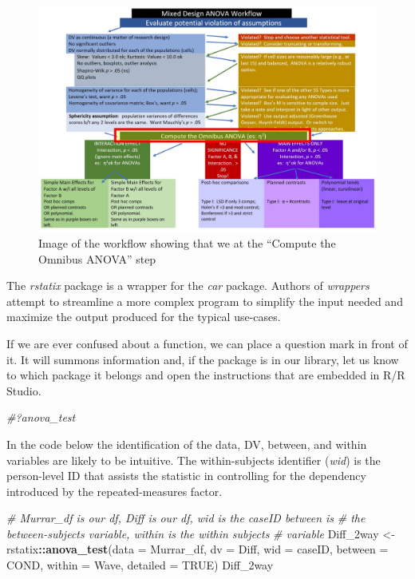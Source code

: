 \documentclass[
  11pt,
]{book}
\newenvironment{Shaded}{\begin{snugshade}}{\end{snugshade}}
\newcommand{\AttributeTok}[1]{\textcolor[rgb]{0.27,0.27,0.27}{#1}}
\newcommand{\CommentTok}[1]{\textcolor[rgb]{0.37,0.37,0.37}{\textit{#1}}}
\newcommand{\ConstantTok}[1]{\textcolor[rgb]{0.37,0.37,0.37}{#1}}
\newcommand{\FunctionTok}[1]{\textcolor[rgb]{0.27,0.27,0.27}{\textbf{#1}}}
\newcommand{\NormalTok}[1]{#1}
\newcommand{\OtherTok}[1]{\textcolor[rgb]{0.37,0.37,0.37}{#1}}
\newcommand{\SpecialCharTok}[1]{\textcolor[rgb]{0.43,0.43,0.43}{\textbf{#1}}}
\begin{document}
\begin{figure}
\centering
\includegraphics{images/mixed/mx_omnibus.jpg}
\caption{Image of the workflow showing that we at the ``Compute the Omnibus ANOVA'' step}
\end{figure}

The \emph{rstatix} package is a wrapper for the \emph{car} package. Authors of \emph{wrappers} attempt to streamline a more complex program to simplify the input needed and maximize the output produced for the typical use-cases.

If we are ever confused about a function, we can place a question mark in front of it. It will summons information and, if the package is in our library, let us know to which package it belongs and open the instructions that are embedded in R/R Studio.

\begin{Shaded}
\begin{Highlighting}[]
\CommentTok{\#?anova\_test}
\end{Highlighting}
\end{Shaded}

In the code below the identification of the data, DV, between, and within variables are likely to be intuitive. The within-subjects identifier (\emph{wid}) is the person-level ID that assists the statistic in controlling for the dependency introduced by the repeated-measures factor.

\begin{Shaded}
\begin{Highlighting}[]
\CommentTok{\# Murrar\_df is our df, Diff is our df, wid is the caseID between is}
\CommentTok{\# the between{-}subjects variable, within is the within subjects}
\CommentTok{\# variable}
\NormalTok{Diff\_2way }\OtherTok{\textless{}{-}}\NormalTok{ rstatix}\SpecialCharTok{::}\FunctionTok{anova\_test}\NormalTok{(}\AttributeTok{data =}\NormalTok{ Murrar\_df, }\AttributeTok{dv =}\NormalTok{ Diff, }\AttributeTok{wid =}\NormalTok{ caseID,}
    \AttributeTok{between =}\NormalTok{ COND, }\AttributeTok{within =}\NormalTok{ Wave, }\AttributeTok{detailed =} \ConstantTok{TRUE}\NormalTok{)}
\NormalTok{Diff\_2way}
\end{Highlighting}
\end{Shaded}
\end{document}

